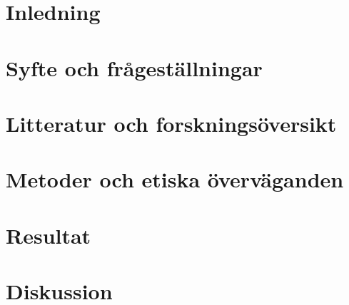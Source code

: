 \pagestyle{plain}
\setcounter{page}{1}

\chapter{Inledning}


\chapter{Syfte och frågeställningar}


\chapter{Litteratur och forskningsöversikt}


\chapter{Metoder och etiska överväganden}


\chapter{Resultat}


\chapter{Diskussion}



